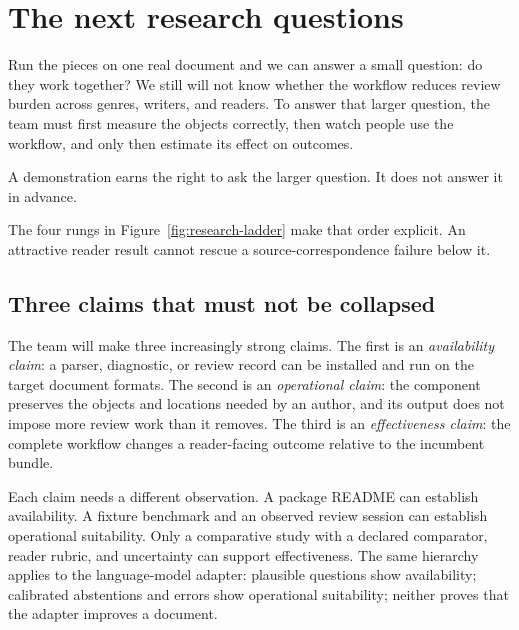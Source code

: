 \chapter{The next research questions}
\label{ch:research-program}

Run the pieces on one real document and we can answer a small question: do they
work together? We still will not know whether the workflow reduces review burden
across genres, writers, and readers. To answer that larger question, the team
must first measure the objects correctly, then watch people use the workflow,
and only then estimate its effect on outcomes.

A demonstration earns the right to ask the larger question. It does not answer
it in advance.

The four rungs in Figure~\ref{fig:research-ladder} make that order explicit.
An attractive reader result cannot rescue a source-correspondence failure
below it.

\hvFigureResearchLadder

\section{Three claims that must not be collapsed}

The team will make three increasingly strong claims. The first is an
\emph{availability claim}: a parser, diagnostic, or review record can be
installed and run on the target document formats. The second is an
\emph{operational claim}: the component preserves the objects and locations
needed by an author, and its output does not impose more review work than it
removes. The third is an \emph{effectiveness claim}: the complete workflow
changes a reader-facing outcome relative to the incumbent bundle.

Each claim needs a different observation. A package README can establish
availability. A fixture benchmark and an observed review session can establish
operational suitability. Only a comparative study with a declared comparator,
reader rubric, and uncertainty can support effectiveness. The same hierarchy
applies to the language-model adapter: plausible questions show availability;
calibrated abstentions and errors show operational suitability; neither proves
that the adapter improves a document.

